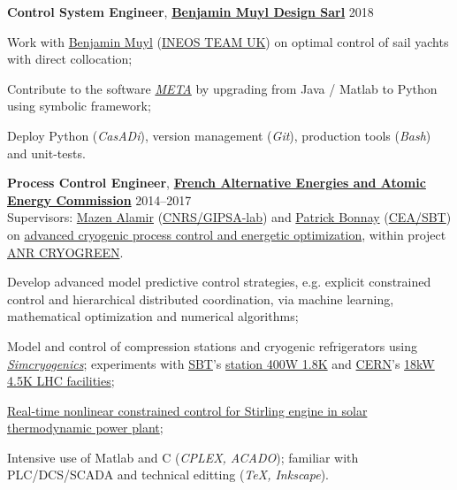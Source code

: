 \documentclass[a4paper,11pt]{article}
\begin{document}
	\vspace{0.1cm}
	
	\textbf{Control System Engineer}, \href{https://www.bmuyl.com/}{\textbf{Benjamin Muyl Design Sarl}}
	\hfill {2018} 
	\begin{innerlist}
		\item Work with \href{https://www.linkedin.com/in/bmuyl/}{Benjamin Muyl}  (\href{https://www.ineosteamuk.com/}{INEOS TEAM UK}) on optimal control of sail yachts with direct collocation;
		\item Contribute to the software \href{https://pole-mer-bretagne-atlantique.com/en/component/projects/project/2235}{\emph{META}} by upgrading from Java / Matlab to Python using symbolic framework; 
		\item Deploy Python (\emph{CasADi}), version management (\emph{Git}), production tools (\emph{Bash}) and unit-tests.
	\end{innerlist}
	
	\vspace{0.1cm}
	
	\textbf{Process Control Engineer}, \href{http://www.cea.fr/}{\textbf{French Alternative Energies and Atomic Energy Commission}} 
	\hfill {2014--2017} \\
	Supervisors: \href{http://www.mazenalamir.fr/home/}{Mazen Alamir} (\href{http://www.cnrs.fr/}{CNRS/GIPSA-lab}) and \href{https://www.researchgate.net/profile/P_Bonnay}{Patrick Bonnay} (\href{http://www.d-sbt.fr/en}{CEA/SBT}) on \href{https://trinhvanvuong.github.io/project/cryogenic-refrigerator/}{advanced cryogenic process control and energetic optimization}, within project \href{https://anr.fr/Project-ANR-13-SEED-0005}{ANR CRYOGREEN}.
	\begin{innerlist}
		\item Develop advanced model predictive control strategies, e.g. explicit constrained control and hierarchical distributed coordination, via machine learning, mathematical optimization and numerical algorithms;
		\item Model and control of compression stations and cryogenic refrigerators using \href{http://www.d-sbt.fr/en/Pages/News/2016_Francois-Bonne.aspx}{\emph{Simcryogenics}}; experiments with \href{http://www.d-sbt.fr/en}{SBT}'s \href{http://inac.cea.fr/en/Phocea/Vie_des_labos/Ast/ast_visu.php?id_ast=771}{station 400W 1.8K} and \href{https://cern.ch}{CERN}'s \href{https://cds.cern.ch/record/708291}{18kW 4.5K LHC facilities};
		\item \href{https://trinhvanvuong.github.io/project/solar-energy/}{Real-time nonlinear constrained control for Stirling engine in solar thermodynamic power plant};
		\item Intensive use of Matlab and C (\emph{CPLEX, ACADO}); familiar with PLC/DCS/SCADA and technical editting (\emph{TeX, Inkscape}).
	\end{innerlist}
	
\end{document}
